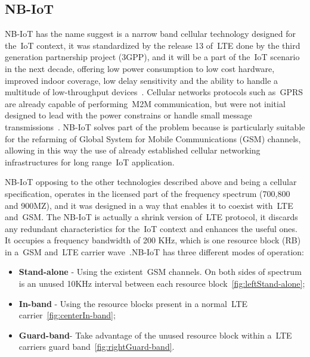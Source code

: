 \newpage
\subsection{NB-IoT} %
\label{sec:nb_sota}

NB-IoT has the name suggest is a narrow band cellular technology designed for the~\gls{IoT} context, it was standardized by the release 13 of~\gls{LTE} done by the third generation partnership project (3GPP), and it will be a part of the~\gls{IoT} scenario in the next decade, offering low power consumption to low cost hardware, improved indoor coverage, low delay sensitivity and the ability to handle a multitude of low-throughput devices~\cite{Gozalvez2016}. Cellular networks protocols such as~\gls{GPRS} are already capable of performing~\gls{M2M} communication, but were not initial designed to lead with the power constrains or handle small message transmissions~\cite{Anteur2016}. NB-IoT solves part of the problem because is particularly suitable for the refarming of Global System for Mobile Communications (\gls{GSM}) channels, allowing in this way the use of  already established cellular networking infrastructures for long range~\gls{IoT} application.

NB-IoT opposing to the other technologies described above and being a cellular specification, operates in the licensed part of the frequency spectrum (700,800 and 900MZ), and it was designed in a way that enables it to coexist with~\gls{LTE} and~\gls{GSM}. The NB-IoT is actually a shrink version of~\gls{LTE} protocol, it discards any redundant characteristics for the~\gls{IoT} context and enhances the useful ones. It occupies a frequency bandwidth of 200 KHz, which is one resource block (RB) in a~\gls{GSM} and~\gls{LTE} carrier wave~\cite{Mekki2019}.\newline NB-IoT has three different modes of operation:
\begin{itemize}
	\item \textbf{Stand-alone} - Using the existent~\gls{GSM} channels. On both sides of spectrum is an unused 10KHz interval between each resource block~\ref{fig:leftStand-alone};
	\item\textbf{In-band} - Using the resource blocks present in a normal~\gls{LTE} carrier~\ref{fig:centerIn-band};
	\item \textbf{Guard-band}- Take advantage of the unused resource block within a~\gls{LTE} carriers guard band~\ref{fig:rightGuard-band}.

\end{itemize} 

